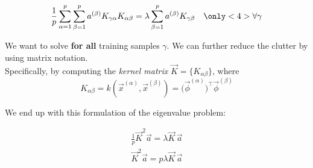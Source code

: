 \begin{frame}{\subsubsecname}
\pause

\newpage


\begin{equation} \label{eq:eigK}
\frac{1}{p} \sum_{\alpha=1}^{p} \sum^{p}_{\beta=1} 
a^{(\beta)}
K_{\gamma \alpha}
K_{\alpha \beta}
 = \lambda 
\sum^{p}_{\beta=1} a^{(\beta)} 
K_{\gamma \beta} \quad {\only<4>{\color{red}}\forall \gamma}
\end{equation}




\end{frame}

\begin{frame}


We want to solve \notesonly{\eqref{eq:eq:eigK}} \textbf{for all} training samples $\gamma$.
We can further reduce the clutter by using matrix notation.\\ 
Specifically, by computing the \emph{kernel matrix} $\vec K=\{K_{\alpha\beta}\}$, where \\
\begin{equation}
K_{\alpha \beta} = 
k(\vec x^{(\alpha)}, \vec x^{(\beta)}) = 
\big(\vec{\phi}^{(\alpha)}\big)^\top 
		\vec{\phi}^{(\beta)}
\end{equation}

We end up with this formulation of the eigenvalue problem:

\begin{align}
	\frac{1}{p} \vec{K}^2 \vec{a} = \lambda \vec{K} \, \vec{a}\\
	\vec{K}^2 \vec{a} = p \lambda \vec{K} \, \vec{a}
\end{align}


\end{frame}

